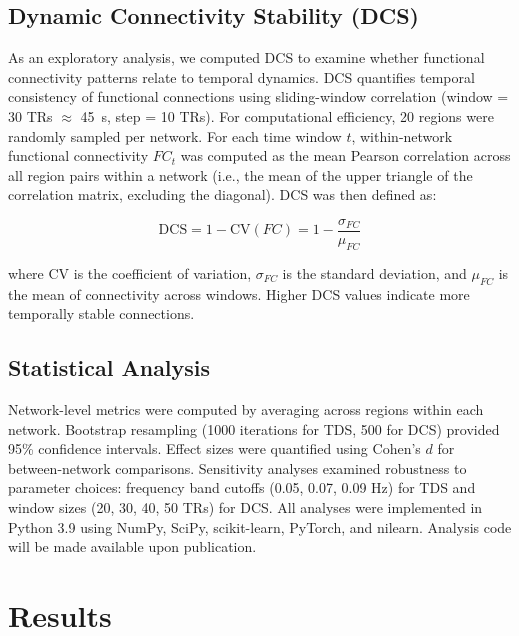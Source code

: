 \documentclass[10pt,letterpaper]{article}
\begin{document}
\subsection{Dynamic Connectivity Stability (DCS)}

As an exploratory analysis, we computed DCS to examine whether functional connectivity patterns relate to temporal dynamics. DCS quantifies temporal consistency of functional connections using sliding-window correlation (window = 30 TRs $\approx$ 45~s, step = 10 TRs). For computational efficiency, 20 regions were randomly sampled per network. For each time window $t$, within-network functional connectivity $FC_t$ was computed as the mean Pearson correlation across all region pairs within a network (i.e., the mean of the upper triangle of the correlation matrix, excluding the diagonal). DCS was then defined as:

\begin{equation}
\text{DCS} = 1 - \text{CV}(FC) = 1 - \frac{\sigma_{FC}}{\mu_{FC}}
\end{equation}

\noindent where CV is the coefficient of variation, $\sigma_{FC}$ is the standard deviation, and $\mu_{FC}$ is the mean of connectivity across windows. Higher DCS values indicate more temporally stable connections.

\subsection{Statistical Analysis}

Network-level metrics were computed by averaging across regions within each network. Bootstrap resampling (1000 iterations for TDS, 500 for DCS) provided 95\% confidence intervals. Effect sizes were quantified using Cohen's $d$ for between-network comparisons. Sensitivity analyses examined robustness to parameter choices: frequency band cutoffs (0.05, 0.07, 0.09 Hz) for TDS and window sizes (20, 30, 40, 50 TRs) for DCS. All analyses were implemented in Python 3.9 using NumPy, SciPy, scikit-learn, PyTorch, and nilearn. Analysis code will be made available upon publication.


\section{Results}
\end{document}
